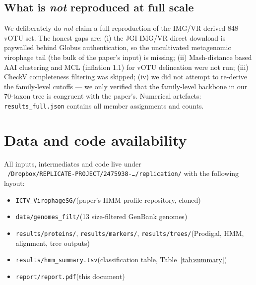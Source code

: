 \documentclass[11pt,a4paper]{article}
\begin{document}
\subsection{What is \emph{not} reproduced at full scale}
We deliberately do \emph{not} claim a full reproduction of the IMG/VR-derived 848-vOTU set. The honest gaps are:
(i) the JGI IMG/VR direct download is paywalled behind Globus authentication, so the uncultivated metagenomic virophage tail (the bulk of the paper's input) is missing;
(ii) Mash-distance based AAI clustering and MCL (inflation 1.1) for vOTU delineation were not run;
(iii) CheckV completeness filtering was skipped;
(iv) we did not attempt to re-derive the family-level cutoffs --- we only verified that the family-level backbone in our 70-taxon tree is congruent with the paper's. Numerical artefacts: \texttt{results\_full.json} contains all member assignments and counts.


\section{Data and code availability}

All inputs, intermediates and code live under\\
\texttt{\string~/Dropbox/REPLICATE-PROJECT/2475938-\ldots/replication/}
with the following layout:
\begin{itemize}[leftmargin=1.4em]
\item \texttt{ICTV\_VirophageSG/}\hfill (paper's HMM profile repository, cloned)
\item \texttt{data/genomes\_filt/}\hfill (13 size-filtered GenBank genomes)
\item \texttt{results/proteins/}, \texttt{results/markers/},
      \texttt{results/trees/}\hfill (Prodigal, HMM, alignment, tree outputs)
\item \texttt{results/hmm\_summary.tsv}\hfill (classification table,
                                               Table~\ref{tab:summary})
\item \texttt{report/report.pdf}\hfill (this document)
\end{itemize}
\end{document}

